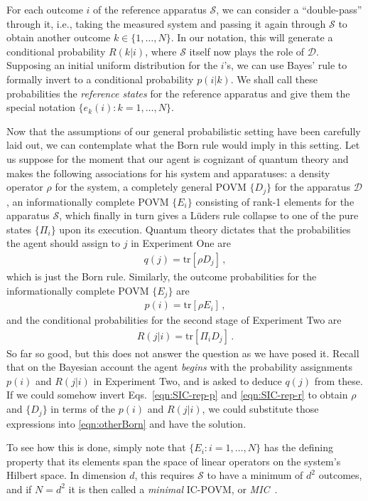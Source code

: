 \documentclass[%
 reprint,superscriptaddress,
 amsmath,amssymb,
 aps,twocolumn,pra
]{revtex4-1}
\newcommand{\eqn}[1]{\begin{eqnarray} #1 \end{eqnarray}}
\newcommand{\tit}[1]{\textit{#1}}
\newcommand{\tr}[1]{  \textrm{tr}\left[ #1 \right]  }
\newcommand{\onestage}{{One}}
\newcommand{\twostage}{{Two}}
\begin{document}
For each outcome $i$ of the reference apparatus $\mathcal{S}$, we can consider a ``double-pass'' through it, i.e., taking the measured system and passing it again through $\mathcal{S}$ to obtain another outcome $k \in \{1,\dots,N \}$. In our notation, this will generate a conditional probability $R(k|i)$, where $\mathcal{S}$ itself now plays the role of $\mathcal{D}$.  Supposing an initial uniform distribution for the $i$'s, we can use Bayes' rule to formally invert to a conditional probability $p(i|k)$.  We shall call these probabilities the \tit{reference states} for the reference apparatus and give them the special notation $\{e_k(i) : k = 1,\dots,N \}$.

Now that the assumptions of our general probabilistic setting have been carefully laid out, we can contemplate what the Born rule would imply in this setting. Let us suppose for the moment that our agent is cognizant of quantum theory and makes the following associations for his system and apparatuses:  a density operator $\rho$ for the system, a completely general POVM $\{D_j\}$ for the apparatus $\mathcal{D}$, an informationally complete POVM $\{E_i\}$ consisting of rank-1 elements for the apparatus $\mathcal{S}$, which finally in turn gives a L\"uders rule collapse to one of the pure states $\{\Pi_i\}$ upon its execution. Quantum theory dictates that the probabilities the agent should assign to $j$ in Experiment \onestage{} are
\eqn{ \label{eqn:otherBorn}
q(j) = \tr{\rho D_j} \, ,
}
which is just the Born rule. Similarly, the outcome probabilities for the informationally complete POVM $\{E_j\}$ are
\eqn{ \label{eqn:SIC-rep-p}
p(i) = \tr{\rho E_i} \, ,
}
and the conditional probabilities for the second stage of Experiment \twostage{} are
\eqn{ \label{eqn:SIC-rep-r}
R(j|i) = \tr{\Pi_i D_j} \, .
}
So far so good, but this does not answer the question as we have posed it. Recall that on the Bayesian account the agent \tit{begins} with the probability assignments $p(i)$ and $R(j|i)$ in Experiment \twostage, and is asked to deduce $q(j)$ from these. If we could somehow invert Eqs.\ \eqref{eqn:SIC-rep-p} and \eqref{eqn:SIC-rep-r} to obtain $\rho$ and $\{ D_j\}$ in terms of the $p(i)$ and $R(j|i)$, we could substitute those expressions into \eqref{eqn:otherBorn} and have the solution.

To see how this is done, simply note that $\{E_i : i=1,\dots,N \}$ has the defining property that its elements span the space of linear operators on the system's Hilbert space. In dimension $d$, this requires $\mathcal{S}$ to have a minimum of $d^2$ outcomes, and if $N=d^2$ it is then called a \tit{minimal} IC-POVM, or \tit{MIC}~\cite{DeBrota20c}.
\end{document}
